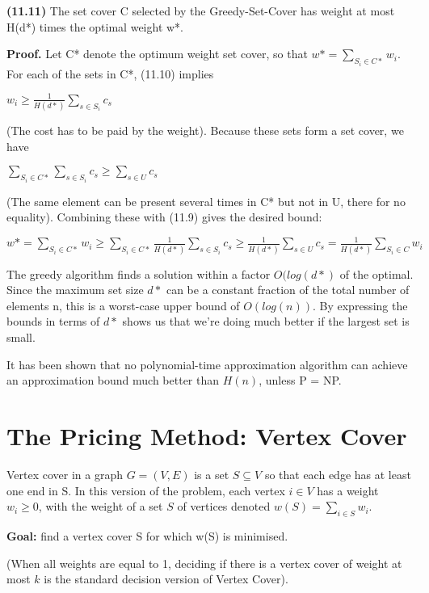 \documentclass{proc}
\begin{document}
\begin{mdframed}
    \textbf{(11.11)} The set cover C selected by the Greedy-Set-Cover has weight at most H(d*) times the optimal weight w*.
    
    \textbf{Proof.} Let C* denote the optimum weight set cover, so that $w* = \sum_{S_i \in C*} w_i$. For each of the sets in C*, (11.10) implies
    
    $w_i \ge \frac{1}{H(d*)} \sum_{s \in S_i} c_s$
    
    (The cost has to be paid by the weight). Because these sets form a set cover, we have
    
    $\sum_{S_i \in C*} \sum_{s \in S_i} c_s \ge \sum_{s \in U} c_s$
    
    (The same element can be present several times in C* but not in U, there for no equality). Combining these with (11.9) gives the desired bound:
    
    $w* = \sum_{S_i \in C*} w_i \ge \sum_{S_i \in C*} \frac{1}{H(d*)} \sum_{s \in S_i} c_s \ge \frac{1}{H(d*)} \sum_{s \in U} c_s = \frac{1}{H(d*)} \sum_{S_i \in C} w_i$
\end{mdframed}

The greedy algorithm finds a solution within a factor $O(log(d*)$ of the optimal. Since the maximum set size $d*$ can be a constant fraction of the total number of elements n, this is a worst-case upper bound of $O(log(n))$. By expressing the bounds in terms of $d*$ shows us that we're doing much better if the largest set is small.

It has been shown that no polynomial-time approximation algorithm can achieve an approximation bound much better than $H(n)$, unless P = NP. 

\section{The Pricing Method: Vertex Cover}

Vertex cover in a graph $G = (V,E)$ is a set $S \subseteq V$ so that each edge has at least one end in S. In this version of the problem, each vertex $i \in V$ has a weight $w_i \ge 0$, with the weight of a set $S$ of vertices denoted $w(S) = \sum_{i \in S} w_i$. 

\begin{mdframed}
    \textbf{Goal:} find a vertex cover S for which w(S) is minimised.
\end{mdframed}

(When all weights are equal to 1, deciding if there is a vertex cover of weight at most $k$ is the standard decision version of Vertex Cover).
\end{document}
